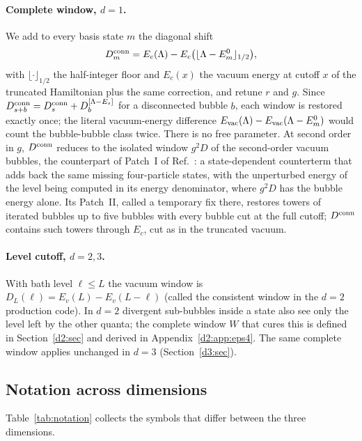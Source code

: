 \paragraph{Complete window, $d=1$.} We add to every basis state $m$ the diagonal shift
\begin{equation}
 D^{\rm conn}_m=E_c(\Lambda)-E_c\big(\lfloor\Lambda-E^0_m\rfloor_{1/2}\big),
 \label{eq:Dconn}
\end{equation}
with $\lfloor\cdot\rfloor_{1/2}$ the half-integer floor and $E_c(x)$ the vacuum energy at cutoff $x$ of the truncated
Hamiltonian plus the same correction, and retune $r$ and $g$. Since $D^{\rm conn}_{s+b}=D^{\rm conn}_s+D^{[\Lambda-E_s]}_b$
for a disconnected bubble $b$, each window is restored exactly once; the literal vacuum-energy difference
$E_{\rm vac}(\Lambda)-E_{\rm vac}(\Lambda-E^0_m)$ would count the bubble-bubble class twice. There is no free parameter.
At second order in $g$, $D^{\rm conn}$ reduces to the isolated window $g^2D$ of the second-order vacuum bubbles, the
counterpart of Patch~I of Ref.~\cite{Elias-Miro:2020qwz}: a state-dependent counterterm that adds back the same missing
four-particle states, with the unperturbed energy of the level being computed in its energy denominator, where $g^2D$
has the bubble energy alone. Its Patch~II, called a temporary fix there, restores towers of iterated bubbles up to five bubbles with every bubble cut at the full cutoff; $D^{\rm conn}$
contains such towers through $E_c$, cut as in the truncated vacuum.

\paragraph{Level cutoff, $d=2,3$.} With bath level $\ell\le L$ the vacuum window is $D_L(\ell)=E_v(L)-E_v(L-\ell)$
(called the consistent window in the $d=2$ production code). In $d=2$ divergent sub-bubbles inside a state also see only
the level left by the other quanta; the complete window $W$ that cures this is defined in Section~\ref{d2:sec} and derived in Appendix~\ref{d2:app:eps4}. The
same complete window applies unchanged in $d=3$ (Section~\ref{d3:sec}).

\subsection{Notation across dimensions}\label{sec:notation}
Table~\ref{tab:notation} collects the symbols that differ between the three dimensions.

